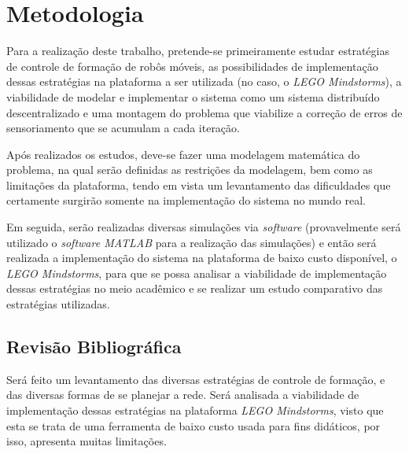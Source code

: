 %
%

\chapter{Metodologia}

Para a realização deste trabalho, pretende-se primeiramente estudar estratégias de controle de formação de robôs móveis, as possibilidades %
de implementação dessas estratégias na plataforma a ser utilizada (no caso, o \emph{LEGO Mindstorms}), a viabilidade de modelar e implementar o sistema como um sistema distribuído descentralizado e uma montagem do problema que viabilize a correção de erros de sensoriamento que se acumulam a cada iteração. 

Após realizados os estudos, deve-se fazer uma modelagem matemática do problema, na qual serão definidas as restrições da modelagem, bem como as limitações da plataforma, tendo em vista um levantamento das dificuldades que certamente surgirão somente na implementação do sistema no mundo real. 

Em seguida, serão realizadas diversas simulações via \emph{software} (provavelmente será utilizado o \emph{software MATLAB} para a realização das simulações) e então será realizada a implementação do sistema na plataforma de baixo custo disponível, o \emph{LEGO Mindstorms}, para que se possa analisar a viabilidade de implementação dessas estratégias no meio acadêmico e se realizar um estudo comparativo das estratégias utilizadas. 


\section{Revisão Bibliográfica}

Será feito um levantamento das diversas estratégias de controle de formação, e das diversas formas de se planejar a rede. Será analisada a viabilidade de implementação dessas estratégias na plataforma \emph{LEGO Mindstorms}, visto que esta se trata de uma ferramenta de baixo custo usada para fins didáticos, por isso, apresenta muitas limitações. 
